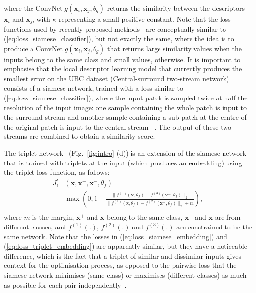 \documentclass[10pt,twocolumn,letterpaper]{article}
\begin{document}
where the ConvNet $g(\mathbf{x}_i, \mathbf{x}_j, \theta_g)$ returns the similarity between the descriptors $\mathbf{x}_i$ and $\mathbf{x}_j$, with $\kappa$ representing a small positive constant.  
Note that the loss functions used by recently proposed methods~\cite{ZagoruykoCVPR15,Han_cvpr15} are conceptually similar to (\ref{eq:loss_siamese_classifier}), but not exactly the same, where the idea is to produce a ConvNet  $g(\mathbf{x}_i, \mathbf{x}_j, \theta_g)$ that returns large similarity values when the inputs belong to the same class and small values, otherwise. 
It is important to emphasise that the local descriptor learning model that currently produces the smallest error on the UBC dataset (Central-surround two-stream network) consists of a siamese network, trained with a loss similar to (\ref{eq:loss_siamese_classifier}), where the input patch is sampled twice at half the resolution of the input image: one sample containing the whole patch is input to the surround stream and another sample containing a sub-patch at the centre of the original patch is input to the central stream ~\cite{ZagoruykoCVPR15}. The output of these two streams are combined to obtain a similarity score.

The triplet network~\cite{Wangcvpr14,hoffer2014deep,SchroffKPcvpr15,wohlhartcvpr15} (Fig.~\ref{fig:intro}-(d)) is an extension of the siamese network that is trained with triplets at the input (which produces an embedding) using the triplet loss function, as follows:
\begin{equation}
\begin{split}
J_1^t  &  ( \mathbf{x},\mathbf{x}^+, \mathbf{x}^-, \theta_f ) =  \\ 
& \max \left ( 0,1-\frac{ \| f^{(1)}(\mathbf{x}, \theta_f) - f^{(3)}(\mathbf{x}^-, \theta_f) \|_2 } { \| f^{(1)}(\mathbf{x}, \theta_f) - f^{(2)}(\mathbf{x}^+, \theta_f) \|_2 + m }  \right ), \\
\end{split}
\label{eq:loss_triplet_embedding}
\end{equation}
where $m$ is the margin, $\mathbf{x}^+$ and $\mathbf{x}$ belong to the same class, $\mathbf{x}^-$ and $\mathbf{x}$ are from different classes, and $f^{(1)}(.)$, $f^{(2)}(.)$ and $f^{(3)}(.)$ are constrained to be the same network.  Note that the losses in (\ref{eq:loss_siamese_embedding}) and (\ref{eq:loss_triplet_embedding}) are apparently similar, but they have a noticeable difference, which is the fact that a triplet of similar and dissimilar inputs gives context for the optimisation process, as opposed to the pairwise loss that the siamese network minimises (same class) or maximises (different classes) as much as possible for each pair independently~\cite{hoffer2014deep}. 
\end{document}
